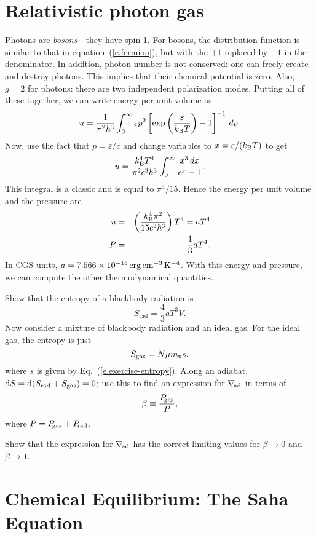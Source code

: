 \section{Relativistic photon gas}\label{s.relativistic-photon-gas}
Photons are \emph{bosons}---they have spin 1. For bosons, the distribution function is similar to that in equation~(\ref{e.fermion}), but with the $+1$ replaced by $-1$ in the denominator. In addition, photon number is not conserved: one can freely create and destroy photons.  This implies that their chemical potential is zero.  Also, $g=2$ for photons: there are two independent polarization modes. Putting all of these together, we can write energy per unit volume as
\begin{equation}\label{e.boson-dist}
u = \frac{1}{\pi^{2}\hbar^{3}}\int_{0}^{\infty}\varepsilon p^{2}\left[\exp\left(\frac{\varepsilon}{k_\mathrm{B} T}\right)-1\right]^{-1}\,dp.
\end{equation}
Now, use the fact that $p = \varepsilon/c$ and change variables to $x = \varepsilon/(k_\mathrm{B} T)$ to get
\[
 u = \frac{k_\mathrm{B} ^{4}T^{4}}{\pi^{2}c^{3}\hbar^{3}}\int_{0}^{\infty} \frac{x^{3}\,dx}{e^{x}-1}.
\]
This integral is a classic and is equal to $\pi^{4}/15$.  Hence the energy per unit volume and the pressure are
\begin{eqnarray}\label{e.radiation-eos}
u &=& \left(\frac{k_\mathrm{B} ^{4}\pi^{2}}{15 c^{3}\hbar^{3}} \right) T^{4} = aT^{4}\\
P &=& \frac{1}{3} aT^{4}.
\end{eqnarray}
In CGS units, $a = 7.566\times 10^{-15}\,\mathrm{erg}\,\mathrm{c}\mathrm{m}^{-3}\,\mathrm{K}^{-4}$.
With this energy and pressure, we can compute the other thermodynamical quantities.  

\begin{exercisebox}
Show that the entropy of a blackbody radiation is
\[ S_{\mathrm{rad}} = \frac{4}{3}aT^{3} V. \]
Now consider a mixture of blackbody radiation and an ideal gas.  For the ideal gas, the entropy is just
\[ S_{\mathrm{gas}} = N\mu m_\mathrm{u} s, \]
where $s$ is given by Eq.~(\ref{e.exercise-entropy}).  Along an adiabat, $\mathrm{d} S = \mathrm{d} (S_{\mathrm{rad}} + S_{\mathrm{gas}}) = 0$; use this to find an expression for $\nabla_{\!\mathrm{ad}}$ in terms of
\[ \beta \equiv \frac{P_{\!\mathrm{gas}}}{P},\]
where $P = P_{\!\mathrm{gas}} + P_{\!\mathrm{rad}}$. 

Show that the expression for $\nabla_{\!\mathrm{ad}}$ has the correct limiting values for $\beta\to 0$ and $\beta\to 1$.
\end{exercisebox}

\section{Chemical Equilibrium: The Saha Equation}

